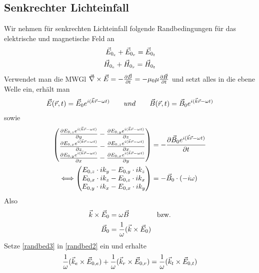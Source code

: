 
\subsection{Senkrechter Lichteinfall}
Wir nehmen für senkrechten Lichteinfall folgende Randbedingungen für
das elektrische und magnetische Feld an
\begin{align}
  \vecE_{0_e} + \vecE_{0_r} = \vecE_{0_t} \label{randbed1}\\
  \vecH_{0_e} + \vecH_{0_r} = \vecH_{0_t} \label{randbed2}
\end{align}
Verwendet man die MWGl
$\vecna\times\vecE = -\dif[\vecB]{t} = -\muo\mu\dif[\vecH]{t}$
und setzt alles in die ebene Welle ein, erhält man
\begin{gather*}
  \vecE(\vecr,t) = \vecE_0 e^{i(\veck\vecr-\omega t)} 
  \qquad{und}\qquad
  \vecB(\vecr,t) = \vecB_0 e^{i(\veck\vecr-\omega t)} 
\end{gather*}
sowie
\begin{align*}
  \begin{pmatrix}
    \dif[E_{0,z}e^{i(\veck\vecr-\omega t)}]{y}
    - \dif[E_{0,y}e^{i(\veck\vecr-\omega t)}]{z}\\
    \dif[E_{0,x}e^{i(\veck\vecr-\omega t)}]{z}
    - \dif[E_{0,z}e^{i(\veck\vecr-\omega t)}]{x}\\
    \dif[E_{0,y}e^{i(\veck\vecr-\omega t)}]{x}
    - \dif[E_{0,x}e^{i(\veck\vecr-\omega t)}]{y}\\
  \end{pmatrix}
&= - \dif[\vecB_0e^{i(\veck\vecr-\omega t)}]{t}\\
  \Longleftrightarrow
  \begin{pmatrix}
    E_{0,z}\cdot ik_y - E_{0,y} \cdot ik_z\\
    E_{0,x}\cdot ik_z - E_{0,z} \cdot ik_x\\
    E_{0,y}\cdot ik_x - E_{0,x} \cdot ik_y
  \end{pmatrix}
& = -\vecB_0\cdot (-i\omega)
\end{align*}
Also
\begin{align}\nonumber
  \veck\times\vecE_0 &= \omega\vecB \qquad\qquad\text{bzw.}\\
  \vecB_0 &= \frac{1}{\omega}(\veck\times\vecE_0) \label{randbed3}
\end{align}
Setze \eqref{randbed3} in \eqref{randbed2} ein und erhalte
\begin{gather*}
  \frac{1}{\omega}(\veck_e\times\vecE_{0,e}) 
  +   \frac{1}{\omega}(\veck_r\times\vecE_{0,r})
  = \frac{1}{\omega}(\veck_t\times\vecE_{0,t}) 
\end{gather*}
